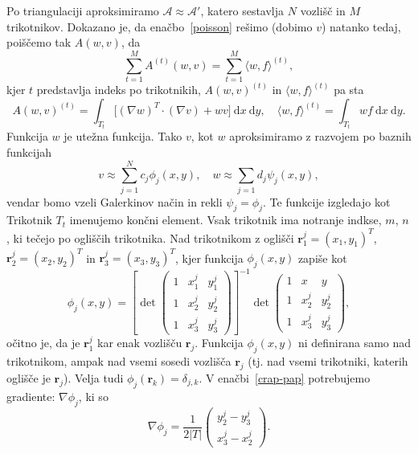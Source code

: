 \documentclass[a4 paper, 12pt]{article}
\renewcommand{\d}{
	\ensuremath{\mathrm{d}}
}
\renewcommand{\r}{
	\ensuremath{\mathbf{r}}
}
\begin{document}
Po triangulaciji aproksimiramo $\mathcal{A} \approx \mathcal{A'}$, katero sestavlja $N$ vozli\v s\v c
in $M$ trikotnikov. Dokazano je, da ena\v cbo~\eqref{poisson} re\v simo (dobimo $v$) natanko tedaj,
poi\v s\v cemo tak $A(w, v)$, da
\begin{equation}
	\sum_{t = 1}^M A^{(t)}(w, v) = \sum_{t = 1}^M \langle w, f \rangle^{(t)},
\end{equation}
kjer $t$ predstavlja indeks po trikotnikih, $A(w,v)^{(t)}$ in $\langle w, f\rangle^{(t)}$ pa sta
\begin{equation}
	A (w, v)^{(t)} = \int_{T_t} \big[(\nabla w)^T \cdot (\nabla v) + wv\big]\ \d x~\d y,\quad
	\langle w, f\rangle^{(t)} = \int_{T_t} w f\ \d x~\d y.
	\label{crap-pap}
\end{equation}
Funkcija $w$ je ute\v zna funkcija. Tako $v$, kot $w$ aproksimiramo z razvojem po baznih funkcijah
\begin{equation}
	v \approx \sum_{j = 1}^N c_j \phi_j (x, y),\quad w \approx \sum_{j = 1} d_j \psi_j (x, y),
\end{equation}
vendar bomo vzeli Galerkinov na\v cin in rekli $\psi_j = \phi_j$. Te funkcije izgledajo kot
Trikotnik $T_t$ imenujemo kon\v cni element. Vsak trikotnik ima notranje indkse, $m$, $n$, ki
te\v cejo po ogli\v s\v cih trikotnika. Nad trikotnikom z ogli\v s\v ci $\r_1^j = (x_1, y_1)^T$,
$\r_2^j = (x_2, y_2)^T$ in $\r_3^j = (x_3, y_3)^T$, kjer funkcija $\phi_j (x,y)$ zapi\v se kot
\begin{equation}
	\phi_j (x,y) = \left[\det \begin{pmatrix}
			1 & x_1^j & y_1^j \\
			1 & x_2^j & y_2^j \\
			1 & x_3^j & y_3^j
		\end{pmatrix} \right]^{-1} \det \begin{pmatrix}
			1 & x     & y     \\
			1 & x_2^j & y_2^j \\
			1 & x_3^j & y_3^j
		\end{pmatrix},
\end{equation}
o\v citno je, da je $\r_1^j$ kar enak vozli\v s\v cu $\r_j$. Funkcija $\phi_j (x,y)$ ni definirana samo
nad trikotnikom, ampak nad vsemi sosedi vozli\v s\v ca $\r_j$ (tj. nad vsemi trikotniki, katerih
ogli\v s\v ce je $\r_j$). Velja tudi $\phi_j (\r_k) = \delta_{j,k}$. V ena\v cbi~\eqref{crap-pap}
potrebujemo gradiente: $\nabla \phi_j$, ki so
\begin{equation}
	\nabla \phi_j = \frac{1}{2|T|} \begin{pmatrix} y^j_2 - y^j_3 \\ x^j_3 - x^j_2 \end{pmatrix}.
\end{equation}
\end{document}
